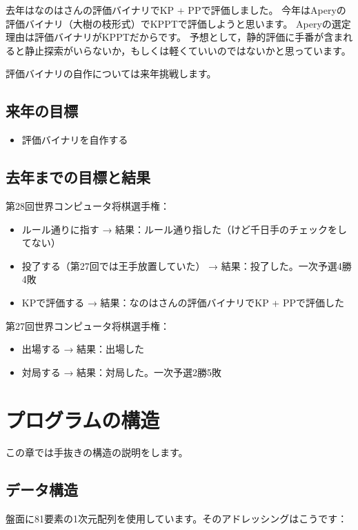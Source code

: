 \documentclass[a4paper]{ltjsarticle}
\begin{document}
去年はなのはさんの評価バイナリでKP + PPで評価しました。
今年はAperyの評価バイナリ（大樹の枝形式）でKPPTで評価しようと思います。
Aperyの選定理由は評価バイナリがKPPTだからです。
予想として，静的評価に手番が含まれると静止探索がいらないか，もしくは軽くていいのではないかと思っています。

評価バイナリの自作については来年挑戦します。


\subsection{来年の目標}

\begin{itemize}
\item 評価バイナリを自作する
\end{itemize}


\subsection{去年までの目標と結果}

第28回世界コンピュータ将棋選手権：
\begin{itemize}
\item ルール通りに指す → 結果：ルール通り指した（けど千日手のチェックをしてない）
\item 投了する（第27回では王手放置していた） → 結果：投了した。一次予選4勝4敗
\item KPで評価する → 結果：なのはさんの評価バイナリでKP + PPで評価した
\end{itemize}

第27回世界コンピュータ将棋選手権：
\begin{itemize}
\item 出場する → 結果：出場した
\item 対局する → 結果：対局した。一次予選2勝5敗
\end{itemize}



\section{プログラムの構造}

この章では手抜きの構造の説明をします。

\subsection{データ構造}

盤面に81要素の1次元配列を使用しています。そのアドレッシングはこうです：
\end{document}
